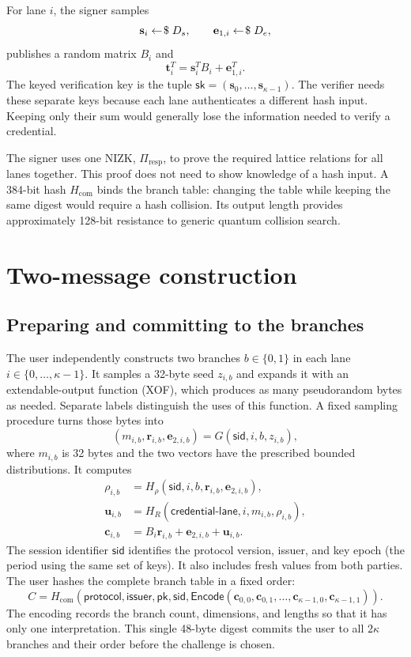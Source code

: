 \documentclass[10pt]{article}
\newcommand{\sample}{\mathrel{\leftarrow\joinrel\$}}
\begin{document}
For lane $i$, the signer samples
\[
  \mathbf s_i\sample D_s,\qquad \mathbf e_{1,i}\sample D_e,
\]
publishes a random matrix $B_i$ and
\[
  \mathbf t_i^T=\mathbf s_i^T B_i+\mathbf e_{1,i}^T.
\]
The keyed verification key is the tuple
$\mathsf{sk}=(\mathbf s_0,\ldots,\mathbf s_{\kappa-1})$.
The verifier needs these separate keys because each lane authenticates a
different hash input.  Keeping only their sum would generally lose the
information needed to verify a credential.

The signer uses one NIZK, $\Pi_{\mathrm{resp}}$, to prove the required lattice
relations for all lanes together.  This proof does not need to show knowledge
of a hash input.  A 384-bit hash $H_{\mathrm{com}}$ binds the branch table:
changing the table while keeping the same digest would require a hash
collision.  Its output length provides approximately 128-bit resistance to
generic quantum collision search.

\section{Two-message construction}\label{sec:construction}

\subsection{Preparing and committing to the branches}

The user independently constructs two branches $b\in\{0,1\}$ in each lane
$i\in\{0,\ldots,\kappa-1\}$.  It samples a 32-byte seed $z_{i,b}$ and expands it with an extendable-output
function (XOF), which produces as many pseudorandom bytes as needed.  Separate
labels distinguish the uses of this function.  A fixed sampling procedure
turns those bytes into
\[
 (m_{i,b},\mathbf r_{i,b},\mathbf e_{2,i,b})
 =G(\mathsf{sid},i,b,z_{i,b}),
\]
where $m_{i,b}$ is 32 bytes and the two vectors have the prescribed bounded
distributions.  It computes
\begin{align*}
 \rho_{i,b}&=H_\rho(\mathsf{sid},i,b,
                     \mathbf r_{i,b},\mathbf e_{2,i,b}),\\
 \mathbf u_{i,b}&=H_R(\mathsf{credential\mbox{-}lane},i,m_{i,b},\rho_{i,b}),\\
 \mathbf c_{i,b}&=B_i\mathbf r_{i,b}+\mathbf e_{2,i,b}
                   +\mathbf u_{i,b}.
\end{align*}
The session identifier $\mathsf{sid}$ identifies the protocol version, issuer,
and key epoch (the period using the same set of keys).  It also includes fresh
values from both parties.  The user hashes the complete branch table in a
fixed order:
\[
 C=H_{\mathrm{com}}(\mathsf{protocol},\mathsf{issuer},\mathsf{pk},
       \mathsf{sid},
       \mathsf{Encode}(\mathbf c_{0,0},\mathbf c_{0,1},\ldots,
                       \mathbf c_{\kappa-1,0},\mathbf c_{\kappa-1,1})).
\]
The encoding records the branch count, dimensions, and lengths so that it has
only one interpretation.  This single 48-byte digest commits the user to all
$2\kappa$ branches and their order before the challenge is chosen.
\end{document}
